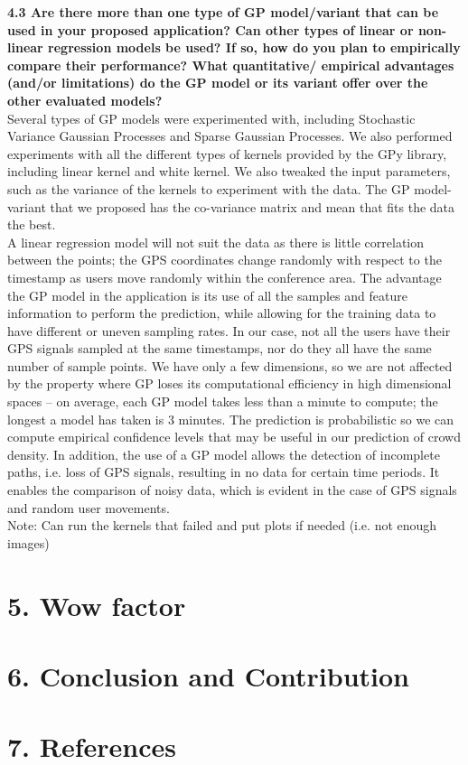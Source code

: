 \documentclass[letterpaper]{article}
\begin{document}
{\bf4.3  Are there more than one type of GP model/variant that can be used in your proposed application? Can other types of linear or non-linear regression models be used? If so, how do you plan to empirically compare their performance? What quantitative/ empirical advantages (and/or limitations) do the GP model or its variant offer over the other evaluated models?} \\

Several types of GP models were experimented with, including Stochastic Variance Gaussian Processes and Sparse Gaussian Processes. We also performed experiments with all the different types of kernels provided by the GPy library, including linear kernel and white kernel. We also tweaked the input parameters, such as the variance of the kernels to experiment with the data. The GP model-variant that we proposed has the co-variance matrix and mean that fits the data the best. \\ 

A linear regression model will not suit the data as there is little correlation between the points; the GPS coordinates change randomly with respect to the timestamp as users move randomly within the conference area. The advantage the GP model in the application is its use of all the samples and feature information to perform the prediction, while allowing for the training data to have different or uneven sampling rates. In our case, not all the users have their GPS signals sampled at the same timestamps, nor do they all have the same number of sample points. We have only a few dimensions, so we are not affected by the property where GP loses its computational efficiency in high dimensional spaces -- on average, each GP model takes less than a minute to compute; the longest a model has taken is 3 minutes. The prediction is probabilistic so we can compute empirical confidence levels that may be useful in our prediction of crowd density. In addition, the use of a GP model allows the detection of incomplete paths, i.e. loss of GPS signals, resulting in no data for certain time periods. It enables the comparison of noisy data, which is evident in the case of GPS signals and random user movements.
\\

Note: Can run the kernels that failed and put plots if needed (i.e. not enough images)

\section{5.  Wow factor}

\section{6.  Conclusion and Contribution}

\section{7.  References}
\end{document}
